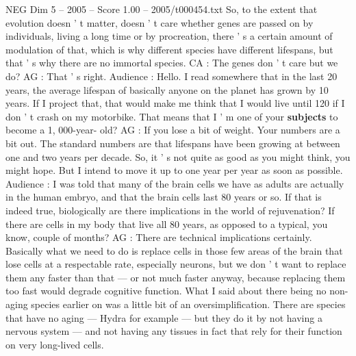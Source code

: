 \begin{textsample}{NEG Dim 5 – 2005 – Score 1.00 – 2005/t000454.txt}
So, to the extent that evolution doesn ' t matter, doesn ' t care whether genes are passed on by individuals, living a long time or by procreation, there ' s a certain amount of modulation of that, which is why different species have different lifespans, but that ' s why there are no immortal species.
CA : The genes don ' t care but we do?
AG : That ' s right.
Audience : Hello.
I read somewhere that in the last 20 years, the average lifespan of basically anyone on the planet has grown by 10 years.
If I project that, that would make me think that I would live until 120 if I don ' t crash on my motorbike.
That means that I ' m one of your \textbf{subjects} to become a 1, 000-year- old?
AG : If you lose a bit of weight.
Your numbers are a bit out.
The standard numbers are that lifespans have been growing at between one and two years per decade.
So, it ' s not quite as good as you might think, you might hope.
But I intend to move it up to one year per year as soon as possible.
Audience : I was told that many of the brain cells we have as adults are actually in the human embryo, and that the brain cells last 80 years or so.
If that is indeed true, biologically are there implications in the world of rejuvenation?
If there are cells in my body that live all 80 years, as opposed to a typical, you know, couple of months?
AG : There are technical implications certainly.
Basically what we need to do is replace cells in those few areas of the brain that lose cells at a respectable rate, especially neurons, but we don ' t want to replace them any faster than that — or not much faster anyway, because replacing them too fast would degrade cognitive function.
What I said about there being no non-aging species earlier on was a little bit of an oversimplification.
There are species that have no aging — Hydra for example — but they do it by not having a nervous system — and not having any tissues in fact that rely for their function on very long-lived cells.

\end{textsample}
